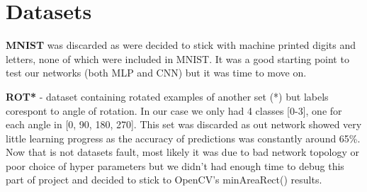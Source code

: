 \documentclass[Report.tex]{subfiles}
\begin{document}
\section{Datasets}
\begin{flushleft}

\textbf{MNIST} was discarded as were decided to stick with machine printed digits and letters, none of which were included in MNIST. It was a good starting point to test our networks (both MLP and CNN) but it was time to move on.

\par
\textbf{ROT*} - dataset containing rotated examples of another set (*) but labels corespont to angle of rotation. In our case we only had 4 classes [0-3], one for each angle in [0, 90, 180, 270].
This set was discarded as out network showed very little learning progress as the accuracy of predictions was constantly around 65\%. Now that is not datasets fault, most likely it was due to bad network topology or poor choice of hyper parameters but we didn't had enough time to debug this part of project and decided to stick to OpenCV's minAreaRect() results. 


\end{flushleft}
\end{document}
